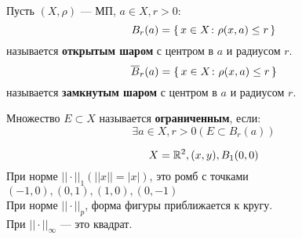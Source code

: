 \begin{definition}
Пусть $(X, \rho)$ --- МП, $a \in X, r > 0$:
\[
    B_r(a) = \set{x \in X \colon \rho(x, a) \leq r}
\]
    называется \textbf{открытым шаром} с центром в $a$ и радиусом $r$.
    \[
    \overline{B}_r(a) = \set{x \in X \colon \rho(x, a) \leq r}
    \]
    называется \textbf{замкнутым шаром} с центром в $a$ и радиусом $r$.
\end{definition}
\begin{definition}
    Множество $E \subset X$ называется \textbf{ограниченным}, если:
    \[
    \exists a \in X, r > 0 (E \subset B_r(a))
    \]
\end{definition}
\begin{example}
    \[
    X = \mathbb{R}^{2}, (x, y), B_1(0, 0)
    \]
    При норме $||\cdot||_1 (||x|| = |x|)$, это ромб с точками $(-1, 0), (0, 1), (1, 0), (0, -1)$ \\
    При норме $||\cdot||_p$, форма фигуры приближается к кругу. \\
    При $||\cdot||_{\infty}$ --- это квадрат.
\end{example}
